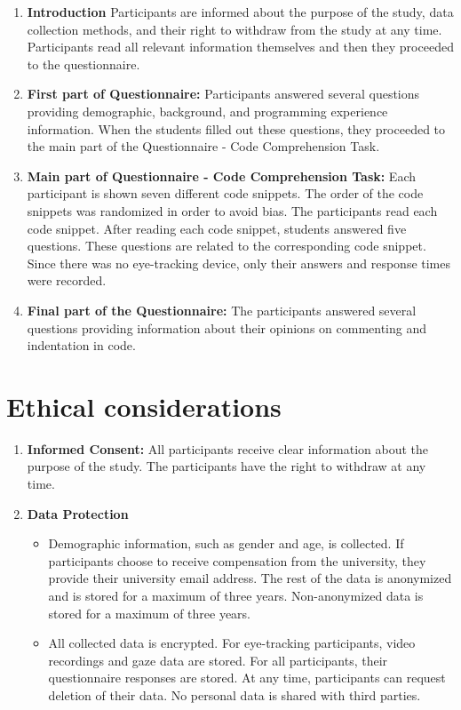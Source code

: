 \begin{enumerate}
    \item \textbf{Introduction} Participants are informed about the purpose of the study, data collection methods, and their right to withdraw from the study at any time. Participants read all relevant information themselves and then they proceeded to the questionnaire.
    
    \item \textbf{First part of Questionnaire:}
    Participants answered several questions providing demographic, background, and programming experience information. When the students filled out these questions, they proceeded to the main part of the Questionnaire - Code Comprehension Task.

    \item \textbf{Main part of Questionnaire - Code Comprehension Task:} Each participant is shown seven different code snippets. The order of the code snippets was randomized in order to avoid bias. The participants read each code snippet. After reading each code snippet, students answered five questions. These questions are related to the corresponding code snippet. Since there was no eye-tracking device, only their answers and response times were recorded.

    \item \textbf{Final part of the Questionnaire:}
    The participants answered several questions providing information about their opinions on commenting and indentation in code.
\end{enumerate}




\section{Ethical considerations}

\begin{enumerate}
    \item \textbf{Informed Consent: }All participants receive clear information about the purpose of the study. The participants have the right to withdraw at any time.
    
    \item \textbf{Data Protection}
    \begin{itemize}
        \item Demographic information, such as gender and age, is collected. If participants choose to receive compensation from the university, they provide their university email address. The rest of the data is anonymized and is stored for a maximum of three years. Non-anonymized data is stored for a maximum of three years.
        \item All collected data is encrypted. For eye-tracking participants, video recordings and gaze data are stored. For all participants, their questionnaire responses are stored. At any time, participants can request deletion of their data. No personal data is shared with third parties.
    \end{itemize}
\end{enumerate}

